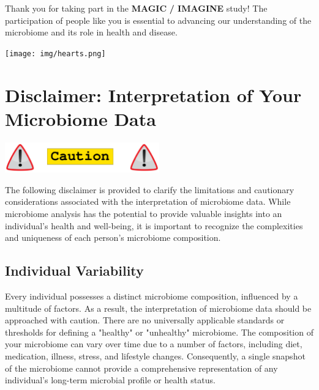 \documentclass[
]{article}
\begin{document}
\begin{multicols}{2}
\raggedcolumns

\vspace*{20pt}

Thank you for taking part in the
\textbf{\color{Cerulean}MAGIC}\textbf{ / \color{RedOrange}IMAGINE}
study! The participation of people like you is essential to advancing
our understanding of the microbiome and its role in health and disease.

\columnbreak

\begin{center}
\texttt{[image: img/hearts.png]}
\end{center}

\end{multicols}

\newpage

\section{Disclaimer: Interpretation of Your Microbiome Data}

\begin{center}
\includegraphics[width=0.5\textwidth]{img/caution_img.png}
\end{center}

\begin{small}
The following disclaimer is provided to clarify the limitations and cautionary
considerations associated with the interpretation of microbiome data. While
microbiome analysis has the potential to provide valuable insights into an
individual's health and well-being, it is important to recognize the
complexities and uniqueness of each person's microbiome composition.
\end{small}

\subsection{Individual Variability}
\begin{small}
Every individual possesses a distinct microbiome composition, influenced by a
multitude of factors. As a result, the interpretation of microbiome data should
be approached with caution. There are no universally applicable standards or
thresholds for defining a "healthy" or "unhealthy" microbiome. The composition
of your microbiome can vary over time due to a number of factors, including
diet, medication, illness, stress, and lifestyle changes. Consequently, a single
snapshot of the microbiome cannot provide a comprehensive representation of any
individual's long-term microbial profile or health status.  
\end{small}
\end{document}
